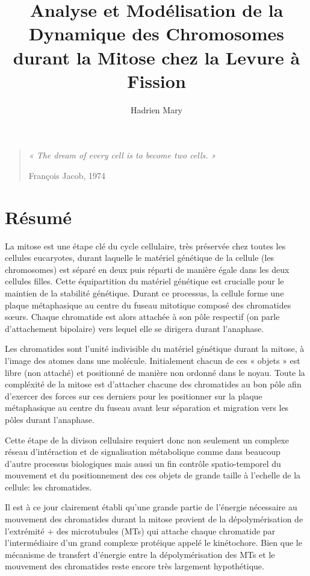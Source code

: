 \documentclass[12pt,a4paper,twoside,openright]{book}
\date{}
\title{Analyse et Modélisation de la Dynamique des Chromosomes durant la Mitose chez la Levure à Fission}
\author{Hadrien Mary}
\begin{document}
\makeflyleaf

\newpage

\thispagestyle{empty}

\vspace*{\fill}

\begin{quote}
    {\centerline {\itshape « The dream of every cell is to become two cells. »}}
    \centerline{François Jacob, 1974}
  \end{quote}\vspace*{\fill}

\newpage

\thispagestyle{empty}

\frontmatter

\chapter{Résumé}\label{ruxe9sumuxe9}

La mitose est une étape clé du cycle cellulaire, très préservée chez
toutes les cellules eucaryotes, durant laquelle le matériel génétique de
la cellule (les chromosomes) est séparé en deux puis réparti de manière
égale dans les deux cellules filles. Cette équipartition du matériel
génétique est crucialle pour le maintien de la stabilité génétique.
Durant ce processus, la cellule forme une plaque métaphasique au centre
du fuseau mitotique composé des chromatides sœurs. Chaque chromatide est
alors attachée à son pôle respectif (on parle d'attachement bipolaire)
vers lequel elle se dirigera durant l'anaphase.

Les chromatides sont l'unité indivisible du matériel génétique durant la
mitose, à l'image des atomes dans une molécule. Initialement chacun de
ces « objets » est libre (non attaché) et positionné de manière non
ordonné dans le noyau. Toute la compléxité de la mitose est d'attacher
chacune des chromatides au bon pôle afin d'exercer des forces sur ces
derniers pour les positionner sur la plaque métaphasique au centre du
fuseau avant leur séparation et migration vers les pôles durant
l'anaphase.

Cette étape de la divison cellulaire requiert donc non seulement un
complexe réseau d'intéraction et de signalisation métabolique comme dans
beaucoup d'autre processus biologiques mais aussi un fin contrôle
spatio-temporel du mouvement et du positionnement des ces objets de
grande taille à l'echelle de la cellule: les chromatides.

Il est à ce jour clairement établi qu'une grande partie de l'énergie
nécessaire au mouvement des chromatides durant la mitose provient de la
dépolymérisation de l'extrémité + des microtubules (MTs) qui attache
chaque chromatide par l'intermédiaire d'un grand complexe protéique
appelé le kinétochore. Bien que le mécanisme de transfert d'énergie
entre la dépolymérisation des MTs et le mouvement des chromatides reste
encore très largement hypothétique.
\end{document}
